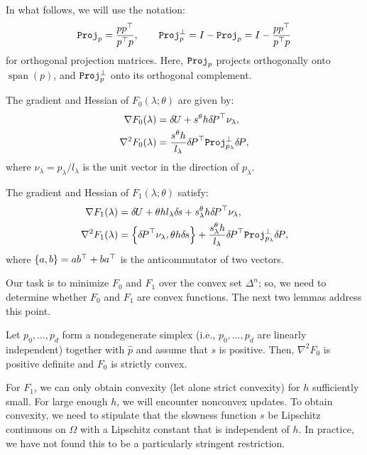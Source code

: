 \documentclass[smallcondensed]{svjour3}
\begin{document}
In what follows, we will use the notation:
\begin{equation}
  \mathtt{Proj}_p = \frac{p p^\top}{p^\top p}, \qquad \mathtt{Proj}_p^\perp = I - \mathtt{Proj}_p = I - \frac{p p^\top}{p^\top p}
\end{equation}
for orthogonal projection matrices. Here, $\mathtt{Proj}_p$ projects
orthogonally onto $\operatorname{span}(p)$, and $\mathtt{Proj}_p^\perp$ onto
its orthogonal complement.

\begin{proposition}\label{prop:F0-grad-and-Hess}
  The gradient and Hessian of $F_0(\lambda; \theta)$ are given by:
  \begin{align}
    \nabla F_0(\lambda) &= {\delta \hspace{-0.09em} U} + s^{\theta} h {\delta \hspace{-0.14em} P}^\top \nu_\lambda,\label{eq:F0-grad} \\
    \nabla^2 F_0(\lambda) &= \frac{s^{\theta} h}{l_\lambda} {\delta \hspace{-0.14em} P}^\top \mathtt{Proj}^\perp_{p_\lambda} {\delta \hspace{-0.14em} P},
  \end{align}
  where $\nu_\lambda = p_\lambda/l_\lambda$ is the unit vector in the
  direction of $p_\lambda$.
\end{proposition}

\begin{proposition}\label{prop:F1-grad-and-Hess}
  The gradient and Hessian of $F_1(\lambda; \theta)$ satisfy:
  \begin{align}
    \nabla F_1(\lambda) &= {\delta \hspace{-0.09em} U} + \theta h l_\lambda {\delta \hspace{-0.1em} s} + s^{\theta}_\lambda h {\delta \hspace{-0.14em} P}^\top \nu_\lambda, \\
    \nabla^2 F_1(\lambda) &= \left\{{\delta \hspace{-0.14em} P}^\top \nu_\lambda, \theta h {\delta \hspace{-0.1em} s}\right\} + \frac{s^\theta_\lambda h}{l_\lambda} {\delta \hspace{-0.14em} P}^\top \mathtt{Proj}^\perp_{p_\lambda} {\delta \hspace{-0.14em} P}, \label{eq:hess-F1}
  \end{align}
  where $\left\{a, b\right\} = ab^\top + ba^\top$ is the anticommutator of two
  vectors.
\end{proposition}

Our task is to minimize $F_0$ and $F_1$ over the convex set
$\Delta^n$; so, we need to determine whether $F_0$ and $F_1$ are
convex functions. The next two lemmas address this point.

\begin{lemma}\label{lemma:dPt-cprojp-dP-pd}
  Let $p_0, \hdots, p_d$ form a nondegenerate simplex (i.e.,
  $p_0, \hdots, p_d$ are linearly independent) together with $\hat{p}$
  and assume that $s$ is positive. Then, $\nabla^2 F_0$ is positive
  definite and $F_0$ is strictly convex.
\end{lemma}

For $F_1$, we can only obtain convexity (let alone strict convexity)
for $h$ sufficiently small. For large enough $h$, we will encounter
nonconvex updates. To obtain convexity, we need to stipulate that the
slowness function $s$ be Lipschitz continuous on $\Omega$ with a
Lipschitz constant that is independent of $h$. In practice, we have
not found this to be a particularly stringent restriction.
\end{document}
